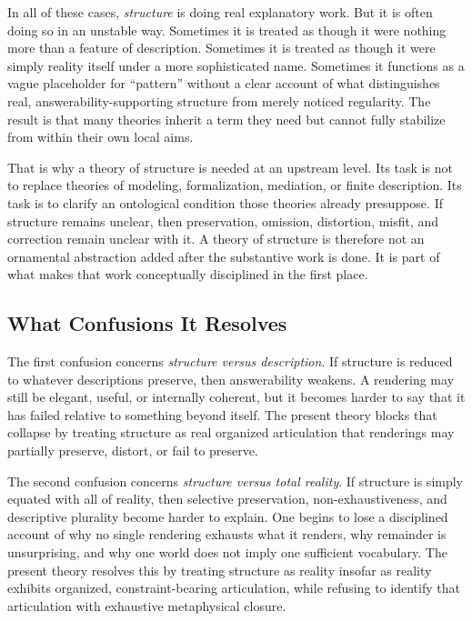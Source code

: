 \documentclass[11pt]{article}
\renewcommand{\emph}[1]{\textit{#1}}
\begin{document}
In all of these cases, \emph{structure} is doing real explanatory work. But it is often doing so in an unstable way. Sometimes it is treated as though it were nothing more than a feature of description. Sometimes it is treated as though it were simply reality itself under a more sophisticated name. Sometimes it functions as a vague placeholder for ``pattern'' without a clear account of what distinguishes real, answerability-supporting structure from merely noticed regularity. The result is that many theories inherit a term they need but cannot fully stabilize from within their own local aims.

That is why a theory of structure is needed at an upstream level. Its task is not to replace theories of modeling, formalization, mediation, or finite description. Its task is to clarify an ontological condition those theories already presuppose. If structure remains unclear, then preservation, omission, distortion, misfit, and correction remain unclear with it. A theory of structure is therefore not an ornamental abstraction added after the substantive work is done. It is part of what makes that work conceptually disciplined in the first place.

\subsection{What Confusions It Resolves}

The first confusion concerns \emph{structure versus description}. If structure is reduced to whatever descriptions preserve, then answerability weakens. A rendering may still be elegant, useful, or internally coherent, but it becomes harder to say that it has failed relative to something beyond itself. The present theory blocks that collapse by treating structure as real organized articulation that renderings may partially preserve, distort, or fail to preserve.

The second confusion concerns \emph{structure versus total reality}. If structure is simply equated with all of reality, then selective preservation, non-exhaustiveness, and descriptive plurality become harder to explain. One begins to lose a disciplined account of why no single rendering exhausts what it renders, why remainder is unsurprising, and why one world does not imply one sufficient vocabulary. The present theory resolves this by treating structure as reality insofar as reality exhibits organized, constraint-bearing articulation, while refusing to identify that articulation with exhaustive metaphysical closure.
\end{document}
